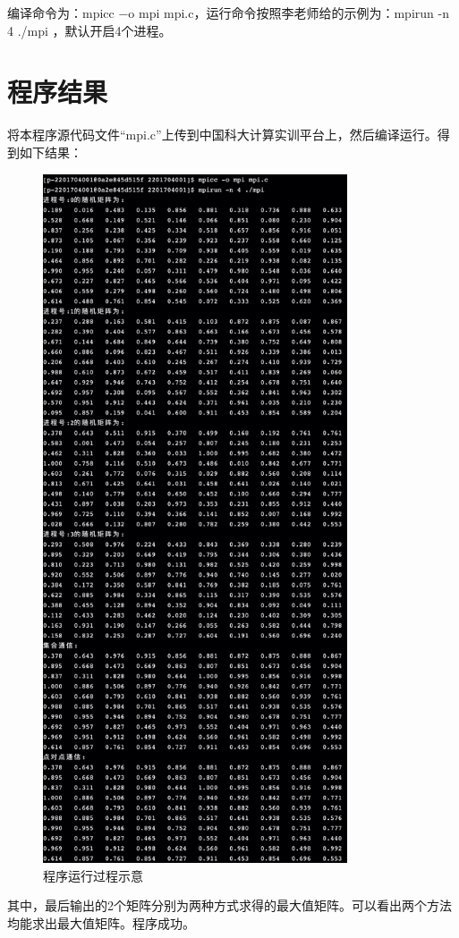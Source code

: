 \documentclass[a4paper,11pt]{article}
\begin{document}
编译命令为：mpicc −o mpi mpi.c，运行命令按照李老师给的示例为：mpirun -n 4 ./mpi ，默认开启4个进程。

\section{程序结果}
将本程序源代码文件“mpi.c”上传到中国科大计算实训平台上，然后编译运行。得到如下结果：


\begin{figure}[!htbp]
\centering
\includegraphics[width = 9cm]{result.jpg}
\caption{程序运行过程示意}	
\end{figure}

其中，最后输出的2个矩阵分别为两种方式求得的最大值矩阵。可以看出两个方法均能求出最大值矩阵。程序成功。
\end{document}
